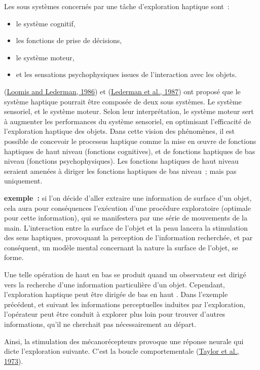\documentclass[
]{book}
\providecommand{\tightlist}{%
  \setlength{\itemsep}{0pt}\setlength{\parskip}{0pt}}
\begin{document}
Les sous systèmes concernés par une tâche d'exploration haptique sont~:

\begin{itemize}
\tightlist
\item
  le système cognitif,
\item
  les fonctions de prise de décisions,
\item
  le système moteur,
\item
  et les sensations psychophysiques issues de
  l'interaction avec les objets.
\end{itemize}

(\protect\hyperlink{ref-loomis1986tactual}{Loomis and Lederman, 1986}) et (\protect\hyperlink{ref-lederman1987haptic}{Lederman et al., 1987}) ont proposé que le
système haptique pourrait être composée de deux sous systèmes. Le système
sensoriel, et le système moteur. Selon leur interprétation, le système moteur
sert à augmenter les performances du système sensoriel, en optimisant
l'efficacité de l'exploration haptique des objets. Dans cette vision des
phénomènes, il est possible de concevoir le processus haptique comme la mise
en œuvre de fonctions haptiques de haut niveau (fonctions cognitives), et de
fonctions haptiques de bas niveau (fonctions psychophysiques). Les fonctions
haptiques de haut niveau seraient amenées à diriger les fonctions haptiques
de bas niveau~; mais pas uniquement.

\textbf{exemple~:}
si l'on décide d'aller extraire une information
de surface d'un objet, cela aura pour conséquences l'exécution d'une
procédure exploratoire (optimale pour cette information), qui se
manifestera par une série de mouvements de la main. L'interaction entre la
surface de l'objet et la peau lancera la stimulation des sens haptiques,
provoquant la perception de l'information recherchée, et par conséquent, un
modèle mental concernant la nature la surface de l'objet, se forme.

Une telle opération de haut en bas se produit quand un observateur est
dirigé vers la recherche d'une information particulière d'un objet.
Cependant, l'exploration haptique peut être dirigée de bas en haut . Dans
l'exemple précédent, et suivant les informations perceptuelles induites par
l'exploration, l'opérateur peut être conduit à explorer plus loin pour
trouver d'autres informations, qu'il ne cherchait pas nécessairement au
départ.

Ainsi, la stimulation des mécanorécepteurs provoque une réponse neurale
qui dicte l'exploration suivante. C'est la boucle comportementale (\protect\hyperlink{ref-taylor1973tactual}{Taylor et al., 1973}).
\end{document}
